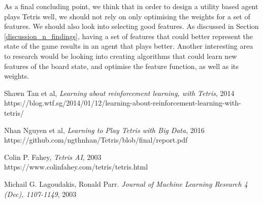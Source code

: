 \documentclass[a4paper,12pt,twocolumn]{article}
\begin{document}
As a final concluding point, we think that in order to design a utility based agent
plays Tetris well, we should not rely on only optimising the weights
for a set of features. We should also look into selecting good features.
As discussed in Section \ref{discussion_n_findings}, having a set of features that
could better represent the state of the game results in an agent that plays better.
Another interesting area to research would be looking into creating algorithms
that could learn new features of the board state, and optimise the feature function,
as well as its weights.

\begin{thebibliography}{9}
    Shawn Tan et al, \textit{Learning about reinforcement learning, with Tetris}, 2014\\https://blog.wtf.sg/2014/01/12/learning-about-reinforcement-learning-with-tetris/

    Nhan Nguyen et al, \textit{Learning to Play Tetris with Big Data}, 2016\\https://github.com/ngthnhan/Tetris/blob/final/report.pdf

    Colin P. Fahey, \textit{Tetris AI}, 2003\\https://www.colinfahey.com/tetris/tetris.html
    
    Michail G. Lagoudakis, Ronald Parr.
    \textit{Journal of Machine Learning Research 4 (Dec), 1107-1149}, 2003
\end{thebibliography}
\end{document}
